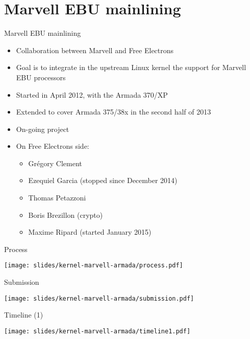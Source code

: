 \section{Marvell EBU mainlining}

\begin{frame}{Marvell EBU mainlining}

\begin{itemize}
\item Collaboration between Marvell and Free Electrons
\item Goal is to integrate in the upstream Linux kernel the support
  for Marvell EBU processors
\item Started in April 2012, with the Armada 370/XP
\item Extended to cover Armada 375/38x in the second half of 2013
\item On-going project
\item On Free Electrons side:
  \begin{itemize}
  \item Grégory Clement
  \item Ezequiel Garcia (stopped since December 2014)
  \item Thomas Petazzoni
  \item Boris Brezillon (crypto)
  \item Maxime Ripard (started January 2015)
  \end{itemize}
\end{itemize}

\end{frame}

\begin{frame}{Process}
  \begin{center}
    \texttt{[image: slides/kernel-marvell-armada/process.pdf]}
  \end{center}
\end{frame}

\begin{frame}{Submission}
  \begin{center}
    \texttt{[image: slides/kernel-marvell-armada/submission.pdf]}
  \end{center}
\end{frame}

\begin{frame}{Timeline (1)}
  \begin{center}
    \texttt{[image: slides/kernel-marvell-armada/timeline1.pdf]}
  \end{center}
\end{frame}

